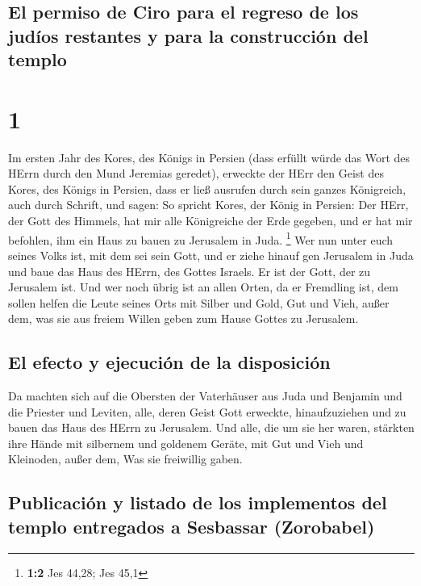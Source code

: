 \hypertarget{el-permiso-de-ciro-para-el-regreso-de-los-juduxedos-restantes-y-para-la-construcciuxf3n-del-templo}{%
\subsection{El permiso de Ciro para el regreso de los judíos restantes y
para la construcción del
templo}\label{el-permiso-de-ciro-para-el-regreso-de-los-juduxedos-restantes-y-para-la-construcciuxf3n-del-templo}}

\hypertarget{section}{%
\section{1}\label{section}}

 Im ersten Jahr des Kores, des Königs in Persien (dass
erfüllt würde das Wort des HErrn durch den Mund Jeremias geredet),
erweckte der HErr den Geist des Kores, des Königs in Persien, dass er
ließ ausrufen durch sein ganzes Königreich, auch durch Schrift, und
sagen:  So spricht Kores, der König in Persien: Der HErr,
der Gott des Himmels, hat mir alle Königreiche der Erde gegeben, und er
hat mir befohlen, ihm ein Haus zu bauen zu Jerusalem in Juda.
\footnote{\textbf{1:2} Jes 44,28; Jes 45,1}  Wer nun unter
euch seines Volks ist, mit dem sei sein Gott, und er ziehe hinauf gen
Jerusalem in Juda und baue das Haus des HErrn, des Gottes Israels. Er
ist der Gott, der zu Jerusalem ist.  Und wer noch übrig
ist an allen Orten, da er Fremdling ist, dem sollen helfen die Leute
seines Orts mit Silber und Gold, Gut und Vieh, außer dem, was sie aus
freiem Willen geben zum Hause Gottes zu Jerusalem.

\hypertarget{el-efecto-y-ejecuciuxf3n-de-la-disposiciuxf3n}{%
\subsection{El efecto y ejecución de la
disposición}\label{el-efecto-y-ejecuciuxf3n-de-la-disposiciuxf3n}}

 Da machten sich auf die Obersten der Vaterhäuser aus Juda
und Benjamin und die Priester und Leviten, alle, deren Geist Gott
erweckte, hinaufzuziehen und zu bauen das Haus des HErrn zu Jerusalem.
 Und alle, die um sie her waren, stärkten ihre Hände mit
silbernem und goldenem Geräte, mit Gut und Vieh und Kleinoden, außer
dem, Was sie freiwillig gaben.

\hypertarget{publicaciuxf3n-y-listado-de-los-implementos-del-templo-entregados-a-sesbassar-zorobabel}{%
\subsection{Publicación y listado de los implementos del templo
entregados a Sesbassar
(Zorobabel)}\label{publicaciuxf3n-y-listado-de-los-implementos-del-templo-entregados-a-sesbassar-zorobabel}}

